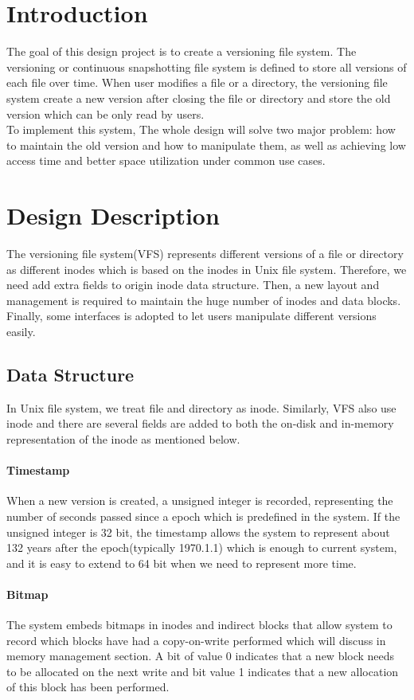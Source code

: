 \section{Introduction}The goal of this design project is to create a versioning file system. The versioning or continuous snapshotting file system is defined to store all versions of each file over time. When user modifies a file or  a directory, the versioning file system create a new version after closing the file or directory and store the old version which can be only read by users. \\[1em]To implement this system, The whole design will solve two major problem: how to maintain the old version and how to manipulate them, as well as achieving low access time and better space utilization under common use cases.
\section{Design Description}
The versioning file system(VFS) represents different versions of a file or directory as different inodes which is based on the inodes in Unix file system. Therefore, we need add extra fields to origin inode data structure. Then, a new layout and management is required to maintain the huge number of inodes and data blocks. Finally, some interfaces is adopted to let users manipulate different versions easily.
\subsection{Data Structure}
In Unix file system, we treat file and directory as inode. Similarly, VFS also use inode and there are several fields are added to both the on-disk and in-memory representation of the inode as mentioned below. 
\paragraph{Timestamp}When a new version is created, a unsigned integer is recorded, representing the number of seconds passed since a epoch which is predefined in the system. If the unsigned integer is 32 bit, the timestamp allows the system to represent about 132 years after the epoch(typically 1970.1.1) which is enough to current system, and it is easy to extend to 64 bit when we need to represent more time. 
\paragraph{Bitmap}The system embeds bitmaps in inodes and indirect blocks that allow system to record which blocks have had a copy-on-write performed which will discuss in memory management section. A bit of value 0 indicates that a new block needs to be allocated on the next write and bit value 1 indicates that a new allocation of this block has been performed.
